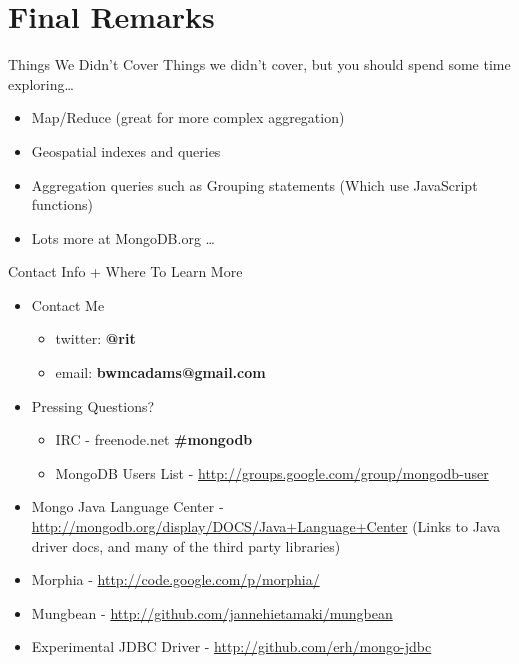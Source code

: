 \documentclass{beamer}
\begin{document}
\section{Final Remarks}
\begin{frame}{Things We Didn't Cover}
    Things we didn't cover, but you should spend some time exploring\ldots
    \begin{itemize}
        \item Map/Reduce (great for more complex aggregation)
        \item Geospatial indexes and queries
        \item Aggregation queries such as Grouping statements (Which use JavaScript functions)
        \item Lots more at MongoDB.org \ldots
    \end{itemize}
\end{frame}
\begin{frame}{Contact Info + Where To Learn More}
    \begin{itemize}
        \item Contact Me
        \begin{itemize}
            \item twitter: {\bf @rit}
            \item email: {\bf bwmcadams@gmail.com}
        \end{itemize}
        \item Pressing Questions?
        \begin{itemize}
            \item IRC - {freenode.net \bf\#mongodb}
            \item MongoDB Users List - \url{http://groups.google.com/group/mongodb-user}
        \end{itemize}
    \item Mongo Java Language Center - \url{http://mongodb.org/display/DOCS/Java+Language+Center} {(\tiny Links to Java driver docs, and many of the third party libraries)}
        \item Morphia - \url{http://code.google.com/p/morphia/}
        \item Mungbean - \url{http://github.com/jannehietamaki/mungbean}
        \item Experimental JDBC Driver - \url{http://github.com/erh/mongo-jdbc}
    \end{itemize}
\end{frame}
\end{document}
